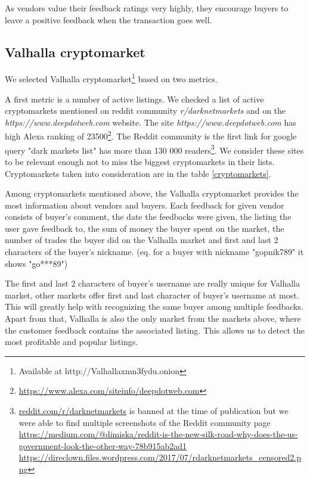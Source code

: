 \documentclass[
  digital, %
  table,   %
  lof,     %
  lot,     %
  oneside
]{fithesis3}
\begin{document}
As vendors value their feedback ratings very highly, they encourage buyers to leave a positive feedback when the transaction goes well.
 
\subsection{Valhalla cryptomarket}

We selected Valhalla cryptomarket\footnote{Available at http://Valhallaxmn3fydu.onion} based on two metrics.

A first metric is a number of active listings.
We checked a list of active cryptomarkets mentioned on reddit community \emph{r/darknetmarkets} and on the 
\emph{https://www.deepdotweb.com} website.
The site \emph{https://www.deepdotweb.com} has high Alexa ranking of 23500\footnote{\url{https://www.alexa.com/siteinfo/deepdotweb.com}}.
The Reddit community is the first link for google query "dark markets list"
has more than 130 000 readers\footnote{\url{reddit.com/r/darknetmarkets} is banned at the time of publication
but we were able to find multiple screenshots of the Reddit community page\newline
\url{https://medium.com/@dimiska/reddit-is-the-new-silk-road-why-does-the-us-government-look-the-other-way-78b915ab2ad1}
\url{https://direclown.files.wordpress.com/2017/07/rdarknetmarkets_censored2.png}}. We consider these sites to be relevant enough not to miss
the biggest cryptomarkets in their lists. Cryptomarkets taken into consideration are in the table \ref{cryptomarkets}.

Among cryptomarkets mentioned above,
the Valhalla cryptomarket provides the most information about vendors and buyers.
Each feedback for given vendor consists of buyer's comment, the date the feedbacks were given, the listing the user gave feedback to, the sum of money the buyer spent on the market, the number of trades the buyer did on the Valhalla market and
first and last 2 characters of the buyer's nickname. 
(eq. for a buyer with nickname "gopnik789" it shows "go***89")

The first and last 2 characters of buyer's username are really unique for Valhalla market,
other markets offer first and last character of buyer's username at most.
This will greatly help with recognizing the same buyer among multiple feedbacks.
Apart from that, Valhalla is also the only market from the markets above, where the customer feedback contains the
associated listing.
This allows us to detect the most profitable and popular listings.
\end{document}
